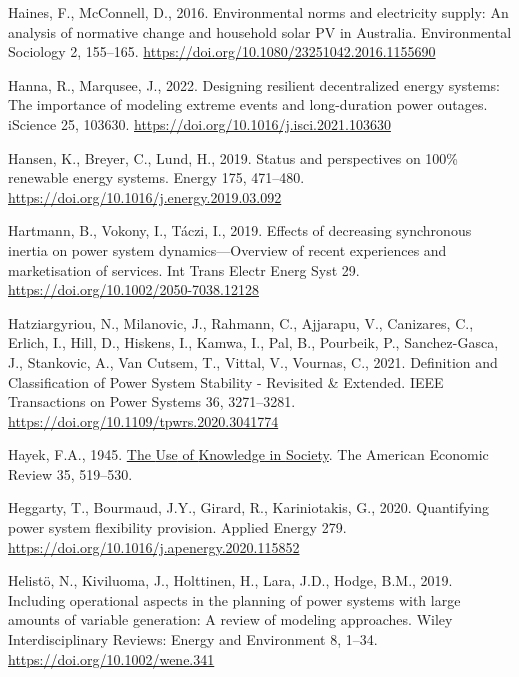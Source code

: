 \documentclass[12pt,a4paper,]{report}
\newlength{\cslhangindent}
\newenvironment{CSLReferences}[2] %
 {%
  \setlength{\parindent}{0pt}
  \ifodd #1 \everypar{\setlength{\hangindent}{\cslhangindent}}\ignorespaces\fi
  \ifnum #2 > 0
  \setlength{\parskip}{#2\baselineskip}
  \fi
 }%
 {}
\begin{document}
\begin{CSLReferences}{1}{0}
\leavevmode{}%
Haines, F., McConnell, D., 2016. Environmental norms and electricity
supply: An analysis of normative change and household solar {PV} in
{Australia}. Environmental Sociology 2, 155--165.
\url{https://doi.org/10.1080/23251042.2016.1155690}

\leavevmode{}%
Hanna, R., Marqusee, J., 2022. Designing resilient decentralized energy
systems: {The} importance of modeling extreme events and long-duration
power outages. iScience 25, 103630.
\url{https://doi.org/10.1016/j.isci.2021.103630}

\leavevmode{}%
Hansen, K., Breyer, C., Lund, H., 2019. Status and perspectives on 100\%
renewable energy systems. Energy 175, 471--480.
\url{https://doi.org/10.1016/j.energy.2019.03.092}

\leavevmode{}%
Hartmann, B., Vokony, I., Táczi, I., 2019. Effects of decreasing
synchronous inertia on power system dynamics---{Overview} of recent
experiences and marketisation of services. Int Trans Electr Energ Syst
29. \url{https://doi.org/10.1002/2050-7038.12128}

\leavevmode{}%
Hatziargyriou, N., Milanovic, J., Rahmann, C., Ajjarapu, V., Canizares,
C., Erlich, I., Hill, D., Hiskens, I., Kamwa, I., Pal, B., Pourbeik, P.,
Sanchez-Gasca, J., Stankovic, A., Van Cutsem, T., Vittal, V., Vournas,
C., 2021. Definition and {Classification} of {Power System Stability} -
{Revisited} \& {Extended}. IEEE Transactions on Power Systems 36,
3271--3281. \url{https://doi.org/10.1109/tpwrs.2020.3041774}

\leavevmode{}%
Hayek, F.A., 1945. \href{https://www.jstor.org/stable/1809376}{The {Use}
of {Knowledge} in {Society}}. The American Economic Review 35, 519--530.

\leavevmode{}%
Heggarty, T., Bourmaud, J.Y., Girard, R., Kariniotakis, G., 2020.
Quantifying power system flexibility provision. Applied Energy 279.
\url{https://doi.org/10.1016/j.apenergy.2020.115852}

\leavevmode{}%
Helistö, N., Kiviluoma, J., Holttinen, H., Lara, J.D., Hodge, B.M.,
2019. Including operational aspects in the planning of power systems
with large amounts of variable generation: {A} review of modeling
approaches. Wiley Interdisciplinary Reviews: Energy and Environment 8,
1--34. \url{https://doi.org/10.1002/wene.341}


\end{CSLReferences}
\end{document}
